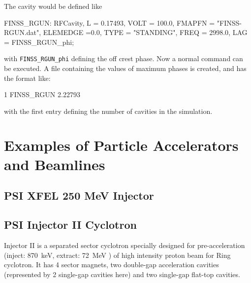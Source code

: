 The cavity would be defined like
\begin{example}
FINSS_RGUN: RFCavity, L = 0.17493, VOLT = 100.0,
	FMAPFN = "FINSS-RGUN.dat",
	ELEMEDGE =0.0, TYPE = "STANDING", FREQ = 2998.0,
	LAG = FINSS_RGUN_phi;
\end{example}
with \texttt{FINSS\_RGUN\_phi} defining the off crest phase. Now a normal  command can be executed. A file containing the values of maximum phases is created, and has the format like:
\begin{example}
1
FINSS_RGUN
2.22793
\end{example}
with the first entry defining the number of cavities in the simulation.


\section{Examples of Particle Accelerators and Beamlines}
\label{sec:examplesbeamlines}



%

\subsection{PSI XFEL 250 MeV Injector}
\label{sec:felinj}



\subsection{PSI Injector II Cyclotron}
\label{sec:inj2}
Injector II is a separated sector cyclotron specially designed for pre-acceleration (inject: \SI{870}{\kilo\electronvolt}, extract: \SI{72}{\mega\electronvolt} )
of high intensity proton beam for Ring cyclotron. It has 4 sector magnets, two double-gap acceleration cavities
(represented by 2 single-gap cavities here) and two single-gap flat-top cavities.

